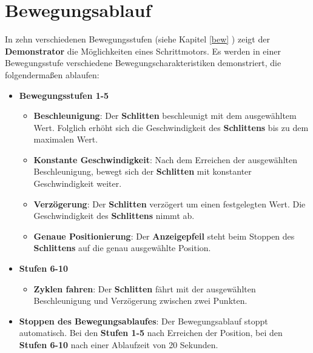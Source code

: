 %
%


\chapter{Bewegungsablauf}

In zehn verschiedenen Bewegungsstufen (siehe Kapitel \ref{bew} ) zeigt der \textbf{Demonstrator} die Möglichkeiten eines Schrittmotors. Es werden in einer Bewegungsstufe verschiedene Bewegungscharakteristiken demonstriert, die folgendermaßen ablaufen:  

\begin{itemize}
	\item \textbf{Bewegungsstufen 1-5}
	\begin{itemize}
		\item\textbf{Beschleunigung}: Der \textbf{Schlitten} beschleunigt mit dem ausgewähltem Wert. Folglich erhöht sich die Geschwindigkeit des \textbf{Schlittens} bis zu dem maximalen Wert. 
		\item\textbf{Konstante Geschwindigkeit}: Nach dem Erreichen der ausgewählten Beschleunigung, bewegt sich der \textbf{Schlitten} mit konstanter Geschwindigkeit weiter.
		\item\textbf{Verzögerung}: Der \textbf{Schlitten} verzögert um einen festgelegten Wert. Die Geschwindigkeit des \textbf{Schlittens} nimmt ab.
		\item\textbf{Genaue Positionierung}: Der \textbf{Anzeigepfeil} steht beim Stoppen des \textbf{Schlittens} auf die genau ausgewählte Position.
	\end{itemize}
\end{itemize}
\begin{itemize}	
	\item \textbf{Stufen 6-10}
	\begin{itemize}
		\item\textbf{Zyklen fahren}: Der \textbf{Schlitten} fährt mit der ausgewählten Beschleunigung und Verzögerung zwischen zwei Punkten.
	\end{itemize}			
\item \textbf{Stoppen des Bewegungsablaufes}: Der Bewegungsablauf stoppt automatisch. Bei den \textbf{Stufen 1-5} nach Erreichen der Position, bei den \textbf{ Stufen 6-10} nach einer Ablaufzeit von 20 Sekunden.
\end{itemize}
